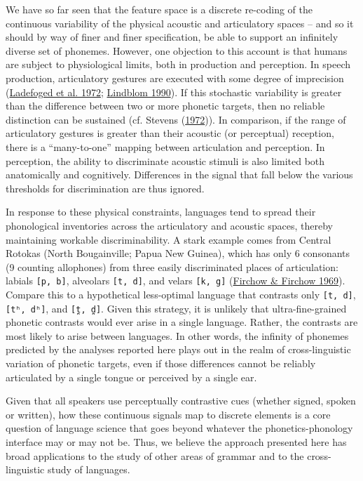 \documentclass[
]{article}
\begin{document}
We have so far seen that the feature space is a discrete re-coding of
the continuous variability of the physical acoustic and articulatory
spaces -- and so it should by way of finer and finer specification, be
able to support an infinitely diverse set of phonemes. However, one
objection to this account is that humans are subject to physiological
limits, both in production and perception. In speech production,
articulatory gestures are executed with some degree of imprecision
(\protect\hyperlink{ref-Ladefoged_etal1972}{Ladefoged et al. 1972};
\protect\hyperlink{ref-Lindblom1990}{Lindblom 1990}). If this stochastic
variability is greater than the difference between two or more phonetic
targets, then no reliable distinction can be sustained (cf. Stevens
(\protect\hyperlink{ref-Stevens1972}{1972})). In comparison, if the
range of articulatory gestures is greater than their acoustic (or
perceptual) reception, there is a ``many-to-one'' mapping between
articulation and perception. In perception, the ability to discriminate
acoustic stimuli is also limited both anatomically and cognitively.
Differences in the signal that fall below the various thresholds for
discrimination are thus ignored.

In response to these physical constraints, languages tend to spread
their phonological inventories across the articulatory and acoustic
spaces, thereby maintaining workable discriminability. A stark example
comes from Central Rotokas (North Bougainville; Papua New Guinea), which
has only 6 consonants (9 counting allophones) from three easily
discriminated places of articulation: labials \texttt{{[}p,\ b{]}},
alveolars \texttt{{[}t,\ d{]}}, and velars \texttt{{[}k,\ g{]}}
(\protect\hyperlink{ref-FirchowFirchow1969}{Firchow \& Firchow 1969}).
Compare this to a hypothetical less-optimal language that contrasts only
\texttt{{[}t,\ d{]}}, \texttt{{[}tʰ,\ dʰ{]}}, and \texttt{{[}t̪,\ d̪{]}}.
Given this strategy, it is unlikely that ultra-fine-grained phonetic
contrasts would ever arise in a single language. Rather, the contrasts
are most likely to arise between languages. In other words, the infinity
of phonemes predicted by the analyses reported here plays out in the
realm of cross-linguistic variation of phonetic targets, even if those
differences cannot be reliably articulated by a single tongue or
perceived by a single ear.

Given that all speakers use perceptually contrastive cues (whether
signed, spoken or written), how these continuous signals map to discrete
elements is a core question of language science that goes beyond
whatever the phonetics-phonology interface may or may not be. Thus, we
believe the approach presented here has broad applications to the study
of other areas of grammar and to the cross-linguistic study of
languages.
\end{document}
